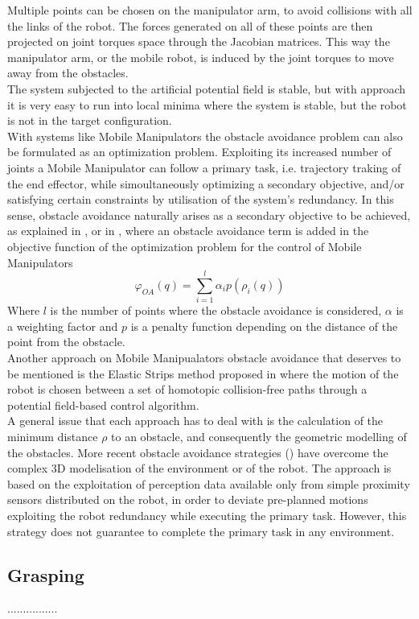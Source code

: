 Multiple points can be chosen on the manipulator arm, to avoid collisions with all the links of the robot. The forces generated on all of these points are then projected on joint torques space through the Jacobian matrices. This way the manipulator arm, or the mobile robot, is induced by the joint torques to move away from the obstacles.\\
The system subjected to the artificial potential field is stable, but with approach it is very easy to run into local minima where the system is stable, but the robot is not in the target configuration.\\
With systems like Mobile Manipulators the obstacle avoidance problem can also be formulated as an optimization problem. Exploiting its increased number of joints a Mobile Manipulator can follow a primary task, i.e. trajectory traking of the end effector, while simoultaneously optimizing a secondary objective, and/or satisfying certain constraints by utilisation of the system's redundancy. In this sense, obstacle avoidance naturally arises as a secondary objective to be achieved, as explained in \cite{yamamoto2},\cite{tanner2000} or in \cite{perdereau2002}, where an obstacle avoidance term is added in the objective function of the optimization problem for the control of Mobile Manipulators
\begin{equation}
	\varphi_{OA}(q)=\sum_{i=1}^{l}\alpha_ip(\rho_i(q))
\end{equation}
Where $l$ is the number of points where the obstacle avoidance is considered, $\alpha$ is a weighting factor and $p$ is a penalty function depending on the distance of the point from the obstacle.\\
Another approach on Mobile Manipualators obstacle avoidance that deserves to be mentioned is the Elastic Strips method proposed in \cite{brockKhatib} where the motion of the robot is chosen between a set of homotopic collision-free paths through a potential field-based control algorithm. \\
A general issue that each approach has to deal with is the calculation of the minimum distance $\rho$ to an obstacle, and consequently the geometric modelling of the obstacles. More recent obstacle avoidance strategies (\cite{falconatale}) have overcome the complex 3D modelisation of the environment or of the robot. The approach is based on the exploitation of perception data available only from simple proximity sensors distributed on the robot, in order to deviate pre-planned motions exploiting the robot redundancy while executing the primary task. However, this strategy does not guarantee to complete the primary task in any environment.
\subsection{Grasping}
................

